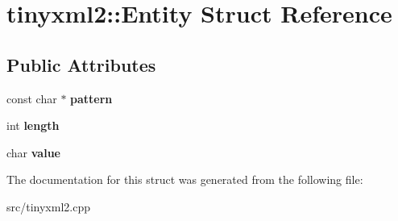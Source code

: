\hypertarget{structtinyxml2_1_1_entity}{}\section{tinyxml2\+:\+:Entity Struct Reference}
\label{structtinyxml2_1_1_entity}
\subsection*{Public Attributes}
\begin{DoxyCompactItemize}
\item 
const char $\ast$ {\bfseries pattern}\hypertarget{structtinyxml2_1_1_entity_ab330f5d665d29bfc811ecfa76315894b}{}\label{structtinyxml2_1_1_entity_ab330f5d665d29bfc811ecfa76315894b}

\item 
int {\bfseries length}\hypertarget{structtinyxml2_1_1_entity_a25e2b57cb59cb4fa68f283d7cb570f21}{}\label{structtinyxml2_1_1_entity_a25e2b57cb59cb4fa68f283d7cb570f21}

\item 
char {\bfseries value}\hypertarget{structtinyxml2_1_1_entity_a7334e81e33b4615655a403711b24f3ed}{}\label{structtinyxml2_1_1_entity_a7334e81e33b4615655a403711b24f3ed}

\end{DoxyCompactItemize}


The documentation for this struct was generated from the following file\+:\begin{DoxyCompactItemize}
\item 
src/tinyxml2.\+cpp\end{DoxyCompactItemize}
